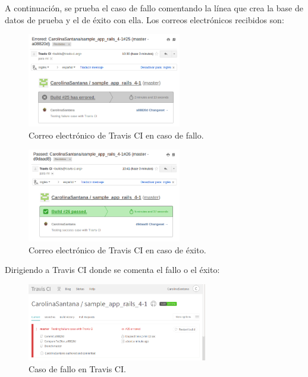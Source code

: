 A continuación, se prueba el caso de fallo comentando la línea que crea la base de datos de prueba  y el de éxito con ella. Los correos electrónicos recibidos son:

\begin{figure}[H]
\centering
\includegraphics[width=0.6\textwidth]{images/figures/travisfailure.png}
\caption{Correo electrónico de Travis CI en caso de fallo.}
\end{figure}

\begin{figure}[H]
\centering
\includegraphics[width=0.6\textwidth]{images/figures/travissuccess.png}
\caption{Correo electrónico de Travis CI en caso de éxito.}
\end{figure}

Dirigiendo a Travis CI donde se comenta el fallo o el éxito:

\begin{figure}[H]
\centering
\includegraphics[width=0.7\textwidth]{images/figures/travisfailure2.png}
\caption{Caso de fallo en Travis CI.}
\end{figure}

